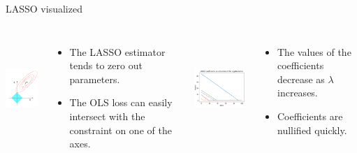 \begin{frame}{LASSO visualized}
    \begin{columns}
        \includegraphics[height=4cm]{images/linear-regression/linear-regression-26.png}
        \begin{itemize}
            \item The LASSO estimator tends to zero out parameters.
            \item The OLS loss can easily intersect with the constraint on one of the axes.
        \end{itemize}

        \includegraphics[height=4cm]{images/linear-regression/linear-regression-27.png}
        \begin{itemize}
            \item The values of the coefficients decrease as $\lambda$ increases.
            \item Coefficients are nullified quickly.
        \end{itemize}
    \end{columns}
\end{frame}



